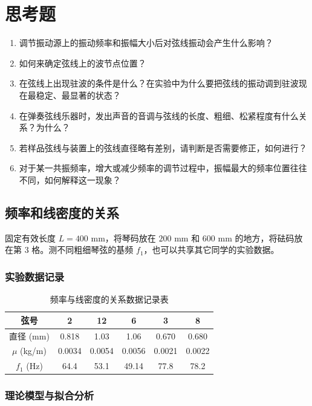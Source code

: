 \documentclass[11pt]{article}
\begin{document}
\section{思考题}
\begin{enumerate}
    \item 调节振动源上的振动频率和振幅大小后对弦线振动会产生什么影响？
    \item 如何来确定弦线上的波节点位置？
    \item 在弦线上出现驻波的条件是什么？在实验中为什么要把弦线的振动调到驻波现在最稳定、最显著的状态？
    \item 在弹奏弦线乐器时，发出声音的音调与弦线的长度、粗细、松紧程度有什么关系？为什么？
    \item 若样品弦线与装置上的弦线直径略有差别，请判断是否需要修正，如何进行？
    \item 对于某一共振频率，增大或减少频率的调节过程中，振幅最大的频率位置往往不同，如何解释这一现象？
\end{enumerate}
\subsection{频率和线密度的关系}

固定有效长度 $L = 400 \text{ mm}$，将琴码放在 $200 \text{ mm}$ 和 $600 \text{ mm}$ 的地方，将砝码放在第 3 格。测不同粗细琴弦的基频 $f_1$，也可以共享其它同学的实验数据。

\subsubsection{实验数据记录}

\begin{table}[h]
    \centering
    \caption{频率与线密度的关系数据记录表}
    \label{tab:freq_density}
    \begin{tabular}{cccccc}
        \toprule
        弦号 & 2 & 12 & 6 & 3 & 8 \\ 
        \midrule
        直径 (mm) & 0.818 & 1.03 & 1.06 & 0.670 & 0.680 \\ 
        $\mu$ (kg/m) & 0.0034 & 0.0054 & 0.0056 & 0.0021 & 0.0022 \\ 
        $f_1$ (Hz) & 64.4 & 53.1 & 49.14 & 77.8 & 78.2 \\ 
        \bottomrule
    \end{tabular}
\end{table}

\subsubsection{理论模型与拟合分析}
\end{document}
